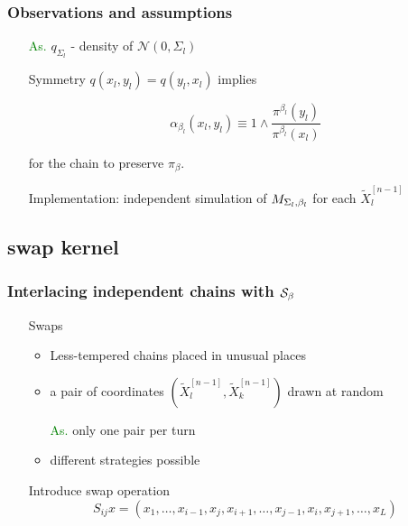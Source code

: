 \begin{frame}
		\frametitle{ Observations and assumptions }

	\begin{itemize}
		\item[\textcolor{green}{As.}] $q_{\Sigma_l}$ - density of $\mathcal{N}(0, \Sigma_l)$
		\item[]
		\item[] Symmetry $q(x_l,y_l) = q(y_l,x_l)$ implies 
		\item[]	$$ \alpha_{\beta_l} (x_l, y_l)  \equiv 1 \wedge \frac{\pi^{\beta_l}(y_l)}{\pi^{\beta_l}(x_l)} $$
		\item[] for the chain to preserve $\pi_\beta$.
		\item[] 
		\item[] Implementation: independent simulation of $M_{\Sigma_{l},\beta_{l}}$ for each $\widetilde{X}^{[n-1]}_l$
		
	\end{itemize}

\end{frame}

		\subsection{swap kernel}

\begin{frame}
		\frametitle{ Interlacing independent chains with $\mathcal{S}_{\beta}$}

	\begin{itemize}
		\item[] Swaps
		\begin{itemize}
			\item Less-tempered chains placed in unusual places
			\item a pair of coordinates $(\widetilde{X}^{[n-1]}_l, \widetilde{X}^{[n-1]}_k)$ drawn at random
			\item[\textcolor{green}{As.}] only one pair per turn
			\item different strategies possible 
		\end{itemize}

		\item[] 
		\item[]	Introduce swap operation 
		$$S_{ij} x = (x_1, \dots, x_{i-1}, x_j, x_{i+1}, \dots, x_{j-1}, x_i, x_{j+1}, \dots, x_L)$$
	\end{itemize}

\end{frame}

